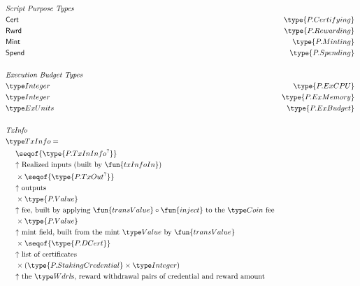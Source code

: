 \begin{figure*}[htb]
  \begin{align*}
    & \emph{Script Purpose Types} \\
    & \mathsf{Cert} & \type{P.Certifying} \\
    & \mathsf{Rwrd} & \type{P.Rewarding} \\
    & \mathsf{Mint} & \type{P.Minting} \\
    & \mathsf{Spend} & \type{P.Spending} \\
    ~\\
    & \emph{Execution Budget Types} \\
    & \Integer & \type{P.ExCPU} \\
    & \Integer  & \type{P.ExMemory}\\
    & \ExUnits & \type{P.ExBudget}  \\
    ~\\
    & \emph{TxInfo} \\
    & \TxInfo = \\
      & ~~~~ \seqof{\type{P.TxInInfo^?}} \\ %
      & ~~~~ \text{$\uparrow$ Realized inputs (built by $\fun{txInfoIn}$)} \\
      & ~~~~ \times \seqof{\type{P.TxOut^?}}  \\
      & ~~~~ \text{$\uparrow$ outputs} \\ %
      & ~~~~ \times \type{P.Value} \\
      & ~~~~ \text{$\uparrow$ fee, built by applying $\fun{transValue}\circ\fun{inject}$ to the $\Coin$ fee} \\ %
      & ~~~~ \times \type{P.Value}  \\
      & ~~~~ \text{$\uparrow$ mint field, built from the mint $\Value$ by $\fun{transValue}$} \\ %
      & ~~~~ \times \seqof{\type{P.DCert}}  \\
      & ~~~~ \text{$\uparrow$ list of certificates} \\ %
      & ~~~~ \times (\type{P.StakingCredential} \times \Integer) \\
      & ~~~~ \text{$\uparrow$ the $\Wdrl$s, reward withdrawal pairs of credential and reward amount} \\ %

\end{align*}
\end{figure*}
